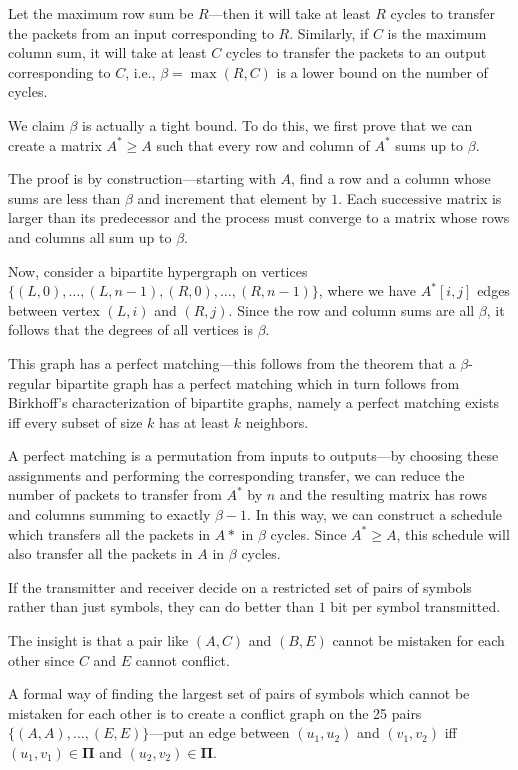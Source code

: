Let the maximum row sum be $R$---then it will take at least $R$ cycles
to transfer the packets from an input corresponding to $R$.
Similarly, if $C$ is the maximum column sum, it will take 
at least $C$ cycles to transfer the packets to an output corresponding to $C$,
i.e., $\beta = \max(R,C)$ is a lower bound on the number of cycles.

We claim $\beta$ is actually a tight bound. To do this, we first prove that
we can create a matrix $A^\ast \geq A$ such that every row and column of
$A^\ast$ sums up to $\beta$.

The proof is by construction---starting with $A$, find a row and a column 
whose sums are less than $\beta$ and increment that element by $1$.
Each successive matrix is larger than its predecessor and the process
must converge to a matrix whose rows and columns all sum up to $\beta$.

Now, consider a bipartite hypergraph on vertices $\{(L,0),\ldots,(L,n-1),
(R,0),\ldots,(R,n-1)\}$, where we have $A^\ast[i,j]$ edges 
between vertex $(L,i)$ and $(R,j)$. Since the row
and column sums are all $\beta$, it follows that the degrees of all vertices
is $\beta$.

This graph has a perfect matching---this follows from the theorem
that a $\beta$-regular bipartite graph has a perfect matching which in
turn follows from Birkhoff's characterization of bipartite graphs, namely a perfect matching exists iff 
every subset of size $k$ has at least $k$ neighbors.

A perfect matching is a permutation from inputs to outputs---by choosing these
assignments and performing the corresponding transfer, we can 
reduce the number of packets to transfer from $A^\ast$ by $n$ and the
resulting matrix has rows and columns summing to exactly $\beta-1$.  In
this way, we can construct a schedule which transfers all the packets in $A\ast$
in $\beta$ cycles.   Since $A^\ast \geq A$, this schedule will
also transfer all the packets in $A$ in $\beta$ cycles.


If the transmitter and receiver decide on a restricted
set of pairs of symbols rather than just symbols, they can do better than 
$1$ bit per symbol transmitted.

The insight is that a pair like $(A,C)$ and $(B,E)$ cannot be mistaken
for each other since $C$ and $E$ cannot conflict.

A formal way of finding the largest set of pairs of symbols
which cannot be mistaken for each other is to create
a conflict graph on the 25 pairs $\{(A,A),\ldots,(E,E)\}$---put
an edge between $(u_1,u_2)$ and $(v_1,v_2)$ iff 
$(u_1,v_1) \in \mathbf{\Pi}$ and $(u_2,v_2) \in  \mathbf{\Pi}$.

